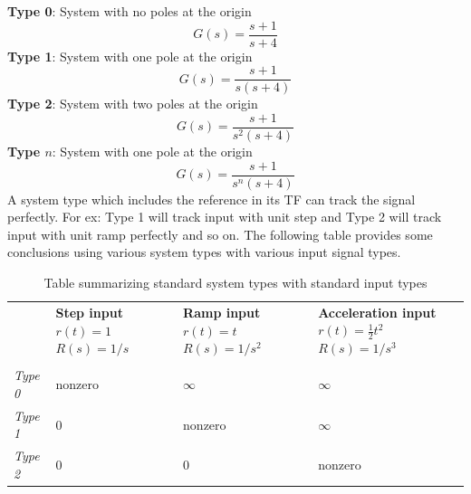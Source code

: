 \textbf{Type 0}: System with no poles at the origin
\begin{equation}
	G(s) = \frac{s + 1}{s + 4}
\end{equation}
\textbf{Type 1}: System with one pole at the origin
\begin{equation}
G(s) = \frac{s + 1}{s(s + 4)}
\end{equation}
\textbf{Type 2}: System with two poles at the origin
\begin{equation}
G(s) = \frac{s + 1}{s^2(s + 4)}
\end{equation}
\textbf{Type $n$}: System with one pole at the origin
\begin{equation}
G(s) = \frac{s + 1}{s^{n}(s + 4)}
\end{equation}
A system type which includes the reference in its TF can track the signal perfectly. For ex: Type 1 will track input with unit step and Type 2 will track input with unit ramp perfectly and so on. The following table provides some conclusions using various system types with various input signal types.
\begin{table}[h!]
	\centering
	\begin{tabular}{p{2.5cm} | p{3cm} | p{3cm} | p{3cm}}
		\toprule
				& \textbf{Step input} $r(t) = 1$ $R(s) = 1/s$ & \textbf{Ramp input} $r(t) = t$ $R(s) = 1 / s^2$ & \textbf{Acceleration input} $r(t) = \frac{1}{2}t^2$ $R(s) = 1 / s^3$ \\
				\cmidrule{1-4} \\
		\textit{Type 0} & nonzero & $\infty$ & $\infty$ \\
		\textit{Type 1} & 0 & nonzero & $\infty$ \\
		\textit{Type 2} & 0 & 0 & nonzero \\
		\bottomrule
	\end{tabular}
	\caption{Table summarizing standard system types with standard input types}
\end{table}
